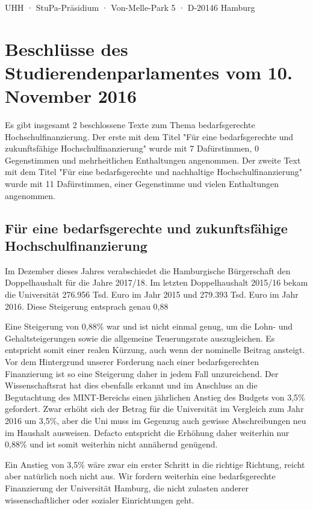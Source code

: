 \documentclass[ngerman,headheight=70pt]{scrartcl}
\begin{document}
    UHH · StuPa-Präsidium · Von-Melle-Park 5 · D-20146 Hamburg

    \section*{Beschlüsse des Studierendenparlamentes vom 10. November 2016}

    Es gibt insgesamt 2 beschlossene Texte zum Thema bedarfsgerechte
    Hochschulfinanzierung. Der erste mit dem Titel "Für eine bedarfsgerechte und
    zukunftsfähige Hochschulfinanzierung" wurde mit 7 Dafürstimmen, 0 Gegenstimmen
    und mehrheitlichen Enthaltungen angenommen.
    Der zweite Text mit dem Titel "Für eine bedarfsgerechte und nachhaltige
    Hochschulfinanzierung" wurde mit 11 Dafürstimmen, einer Gegenstimme und
    vielen Enthaltungen angenommen.

    \subsection*{Für eine bedarfsgerechte und zukunftsfähige Hochschulfinanzierung}

    Im Dezember dieses Jahres verabschiedet die Hamburgische Bürgerschaft den
    Doppelhaushalt für die Jahre 2017/18. Im letzten Doppelhaushalt 2015/16 bekam
    die Universität 276.956 Tsd. Euro im Jahr 2015 und 279.393 Tsd. Euro im Jahr
    2016. Diese Steigerung entsprach genau 0,88%

    Eine Steigerung von 0,88\% war und ist nicht einmal genug, um die Lohn- und
    Gehaltsteigerungen sowie die allgemeine Teuerungsrate auszugleichen. Es
    entspricht somit einer realen Kürzung, auch wenn der nominelle Beitrag
    ansteigt. Vor dem Hintergrund unserer Forderung nach einer bedarfsgerechten
    Finanzierung ist so eine Steigerung daher in jedem Fall unzureichend. Der
    Wissenschaftsrat hat dies ebenfalls erkannt und im Anschluss an die Begutachtung
    des MINT-Bereichs einen jährlichen Anstieg des Budgets von 3,5\% gefordert.
    Zwar erhöht sich der Betrag für die Universität im Vergleich zum Jahr 2016 um
    3,5\%, aber die Uni muss im Gegenzug auch gewisse Abschreibungen neu im
    Haushalt ausweisen. Defacto entspricht die Erhöhung daher weiterhin nur 0,88\%
    und ist somit weiterhin nicht annähernd genügend.

    Ein Anstieg von 3,5\% wäre zwar ein erster Schritt in die richtige Richtung,
    reicht aber natürlich noch nicht aus. Wir fordern weiterhin eine
    bedarfsgerechte Finanzierung der Universität Hamburg, die nicht zulasten
    anderer wissenschaftlicher oder sozialer Einrichtungen geht.
\end{document}
